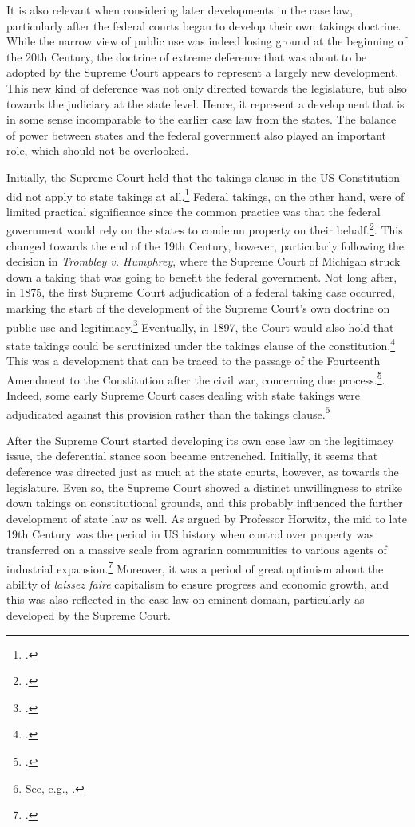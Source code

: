 It is also relevant when considering later developments in the case law, particularly after the federal courts began to develop their own takings doctrine. While the narrow view of public use was indeed losing ground at the beginning of the 20th Century, the doctrine of extreme deference that was about to be adopted by the Supreme Court appears to represent a largely new development. This new kind of deference was not only directed towards the legislature, but also towards the judiciary at the state level. Hence, it represent a development that is in some sense incomparable to the earlier case law from the states. The balance of power between states and the federal government also played an important role, which should not be overlooked. 

Initially, the Supreme Court held that the takings clause in the US Constitution did not apply to state takings at all.\footcite{barron33} Federal takings, on the other hand, were of limited practical significance since the common practice was that the federal government would rely on the states to condemn property on their behalf.\footcite[30]{meidinger80}. This changed towards the end of the 19th Century, however, particularly following the decision in {\it Trombley v. Humphrey}, where the Supreme Court of Michigan struck down a taking that was going to benefit the federal government.\cite{trombley71} Not long after, in 1875, the first Supreme Court adjudication of a federal taking case occurred, marking the start of the development of the Supreme Court's own doctrine on public use and legitimacy.\footcite{kohl75} Eventually, in 1897, the Court would also hold that state takings could be scrutinized under the takings clause of the constitution.\footcite{chicago97} This was a development that can be traced to the passage of the Fourteenth Amendment to the Constitution after the civil war, concerning due process.\footcite{johnson11}. Indeed, some early Supreme Court cases dealing with state takings were adjudicated against this provision rather than the takings clause.\footnote{See, e.g., \cite{head85}.}

After the Supreme Court started developing its own case law on the legitimacy issue, the deferential stance soon became entrenched. Initially, it seems that deference was directed just as much at the state courts, however, as towards the legislature. Even so, the Supreme Court showed a distinct unwillingness to strike down takings on constitutional grounds, and this probably influenced the further development of state law as well. As argued by Professor Horwitz, the mid to late 19th Century was the period in US history when control over property was transferred on a massive scale from agrarian communities to various agents of industrial expansion.\footcite{horwitz73} Moreover, it was a period of great optimism about the ability of {\it laissez faire} capitalism to ensure progress and economic growth, and this was also reflected in the case law on eminent domain, particularly as developed by the Supreme Court.

